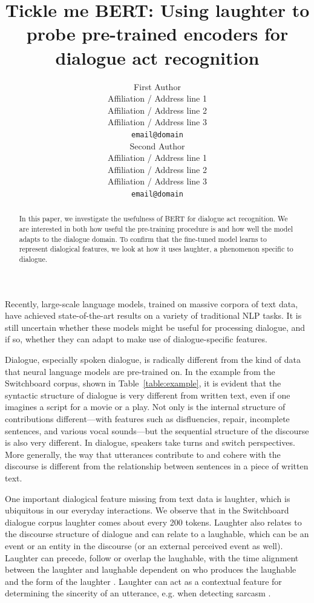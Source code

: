 \documentclass[11pt,a4paper]{article}
\title{Tickle me BERT: Using laughter to probe pre-trained encoders for dialogue act recognition}
\author{First Author \\
  Affiliation / Address line 1 \\
  Affiliation / Address line 2 \\
  Affiliation / Address line 3 \\
  \texttt{email@domain} \\\And
  Second Author \\
  Affiliation / Address line 1 \\
  Affiliation / Address line 2 \\
  Affiliation / Address line 3 \\
  \texttt{email@domain} \\}
\date{}
\begin{document}
\maketitle
\begin{abstract}
  In this paper, we investigate the usefulness of BERT for dialogue act recognition.
  We are interested in both how useful the pre-training procedure is and 
  how well the model adapts to the dialogue domain.
  To confirm that the fine-tuned model learns to represent dialogical features, 
  we look at how it uses laughter, a phenomenon specific to dialogue.
\end{abstract}


Recently, large-scale language models, trained on massive corpora of text data, have achieved state-of-the-art results on a variety of traditional NLP tasks.
It is still uncertain whether these models might be useful for processing dialogue, and if so, whether they can adapt to make use of dialogue-specific features.

Dialogue, especially spoken dialogue, is radically different from the kind of data that neural language models are pre-trained on.
In the example from the Switchboard corpus, shown in Table~\ref{table:example}, it is evident that the syntactic structure of dialogue is very different from  written text, even if one imagines a script for a movie or a play.
Not only is the internal structure of contributions different---with features such as disfluencies, repair, incomplete sentences, and various vocal sounds---but the sequential structure of the discourse is also very different.
In dialogue, speakers take turns and switch perspectives.
More generally, the way that utterances contribute to and cohere with the discourse is different from the relationship between sentences in a piece of written text.

One important dialogical feature missing from text data is laughter, which is ubiquitous in our everyday interactions.
We observe that in the Switchboard dialogue corpus laughter comes about every 200 tokens.
Laughter also relates to the discourse structure of dialogue and can relate to a laughable, which can be an event or an entity in the discourse (or an external perceived event as well).
Laughter can precede, follow or overlap the laughable, with the time alignment between the laughter and laughable dependent on who produces the laughable and the form of the laughter \citep{tian2016we}.
Laughter can act as a contextual feature for determining the sincerity of an utterance, e.g. when detecting sarcasm \citep{tepperman2006yeah}.
\end{document}
